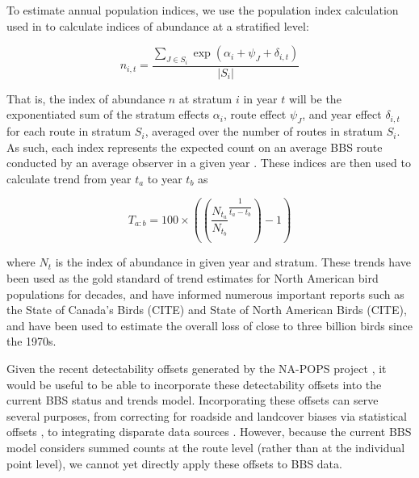 \documentclass[12pt]{article}
\begin{document}
\par To estimate annual population indices, we use the population index calculation used in \citet{smith_north_2020} to calculate indices of abundance at a stratified level:

\begin{equation}\label{index}
	n_{i,t} = \dfrac{\sum_{J\in S_i}\exp(\alpha_i + \psi_J + \delta_{i,t})}{|S_i|}
\end{equation}

That is, the index of abundance $n$ at stratum $i$ in year $t$ will be the exponentiated sum of the stratum effects $\alpha_i$, route effect $\psi_J$, and year effect $\delta_{i,t}$ for each route in stratum $S_i$, averaged over the number of routes in stratum $S_i$.
As such, each index represents the expected count on an average BBS route conducted by an average observer in a given year \citep{smith_north_2020}.
These indices are then used to calculate trend from year $t_a$ to year $t_b$ as

\begin{equation*}
	T_{a:b} = 100 \times \left( \left( \dfrac{N_{t_a}}{N_{t_b}} ^ {\dfrac{1}{t_a - t_b}} \right) - 1 \right)
\end{equation*}

where $N_t$ is the index of abundance in given year and stratum.
These trends have been used as the gold standard of trend estimates for North American bird populations for decades, and have informed numerous important reports such as the State of Canada's Birds (CITE) and State of North American Birds (CITE), and have been used to estimate the overall loss of close to three billion birds since the 1970s. 

Given the recent detectability offsets generated by the NA-POPS project \citep{edwards_point_2023}, it would be useful to be able to incorporate these detectability offsets into the current BBS status and trends model. 
Incorporating these offsets can serve several purposes, from correcting for roadside and landcover biases via statistical offsets \citep{thogmartin_sensitivity_2010, solymos_lessons_2020, edwards_point_2023}, to integrating disparate data sources \citep{solymos_calibrating_2013, edwards_point_2023}. 
However, because the current BBS model considers summed counts at the route level (rather than at the individual point level), we cannot yet directly apply these offsets to BBS data. 
\end{document}
